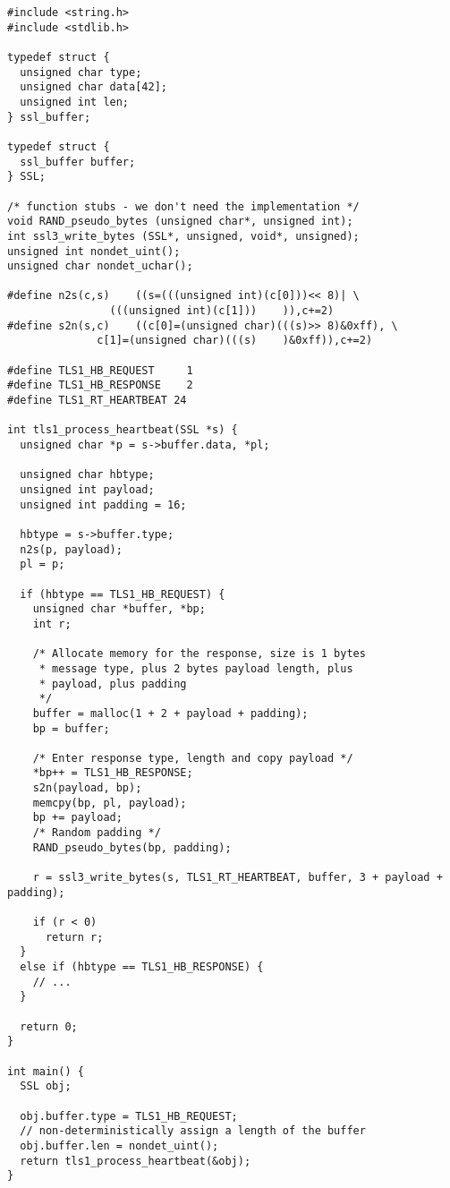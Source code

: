 \documentclass[11pt,a4paper]{article}
\begin{document}
\noindent
\begin{lstlisting}
#include <string.h>
#include <stdlib.h>

typedef struct {
  unsigned char type;
  unsigned char data[42];
  unsigned int len;
} ssl_buffer;

typedef struct {
  ssl_buffer buffer;
} SSL;

/* function stubs - we don't need the implementation */
void RAND_pseudo_bytes (unsigned char*, unsigned int);
int ssl3_write_bytes (SSL*, unsigned, void*, unsigned);
unsigned int nondet_uint();
unsigned char nondet_uchar();

#define n2s(c,s)	((s=(((unsigned int)(c[0]))<< 8)| \
			    (((unsigned int)(c[1]))    )),c+=2)
#define s2n(s,c)	((c[0]=(unsigned char)(((s)>> 8)&0xff), \
			  c[1]=(unsigned char)(((s)    )&0xff)),c+=2)

#define TLS1_HB_REQUEST		1
#define TLS1_HB_RESPONSE	2
#define TLS1_RT_HEARTBEAT 24

int tls1_process_heartbeat(SSL *s) {
  unsigned char *p = s->buffer.data, *pl;

  unsigned char hbtype;
  unsigned int payload;
  unsigned int padding = 16;

  hbtype = s->buffer.type;
  n2s(p, payload);
  pl = p;

  if (hbtype == TLS1_HB_REQUEST) {
    unsigned char *buffer, *bp;
    int r;

    /* Allocate memory for the response, size is 1 bytes
     * message type, plus 2 bytes payload length, plus
     * payload, plus padding
     */
    buffer = malloc(1 + 2 + payload + padding);
    bp = buffer;

    /* Enter response type, length and copy payload */
    *bp++ = TLS1_HB_RESPONSE;
    s2n(payload, bp);
    memcpy(bp, pl, payload);
    bp += payload;
    /* Random padding */
    RAND_pseudo_bytes(bp, padding);

    r = ssl3_write_bytes(s, TLS1_RT_HEARTBEAT, buffer, 3 + payload + padding);

    if (r < 0)
      return r;
  }
  else if (hbtype == TLS1_HB_RESPONSE) {
    // ...
  }

  return 0;
}

int main() {
  SSL obj;

  obj.buffer.type = TLS1_HB_REQUEST;
  // non-deterministically assign a length of the buffer
  obj.buffer.len = nondet_uint();
  return tls1_process_heartbeat(&obj);
}
\end{lstlisting}
\end{document}
